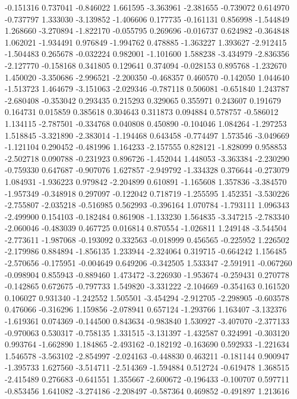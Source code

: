 -0.151316
0.737041
-0.846022
1.661595
-3.363961
-2.381655
-0.739072
0.614970
-0.737797
1.333030
-3.139852
-1.406606
0.177735
-0.161131
0.856998
-1.544849
1.268660
-3.270894
-1.822170
-0.055795
0.269696
-0.016737
0.624982
-0.364848
1.062021
-1.934491
0.976849
-1.994762
0.478885
-1.363227
1.393627
-2.912415
-1.504483
0.265678
-0.032224
0.982001
-1.101600
1.588238
-3.434979
-2.836356
-2.127770
-0.158168
0.341805
0.129641
0.374094
-0.028153
0.895768
-1.232670
1.450020
-3.350686
-2.996521
-2.200350
-0.468357
0.460570
-0.142050
1.044640
-1.513723
1.464679
-3.151063
-2.029346
-0.787118
0.506081
-0.651840
1.243787
-2.680408
-0.353042
0.293435
0.215293
0.329065
0.355971
0.243607
0.191679
0.164731
0.015859
0.385618
0.304643
0.311873
0.094884
0.578757
-0.586012
1.134115
-2.787501
-0.334768
0.040808
0.450890
-0.104046
1.084264
-1.297253
1.518845
-3.321890
-2.383014
-1.194468
0.643458
-0.774497
1.573546
-3.049669
-1.121104
0.290452
-0.481996
1.164233
-2.157555
0.828121
-1.828099
0.958853
-2.502718
0.090788
-0.231923
0.896726
-1.452044
1.448053
-3.363384
-2.230290
-0.759330
0.647687
-0.907076
1.627857
-2.949792
-1.334328
0.376644
-0.273079
1.084931
-1.936223
0.979842
-2.204899
0.610891
-1.165608
1.357836
-3.384570
-1.957349
-0.348918
0.297097
-0.122042
0.718719
-1.255595
1.452351
-3.530226
-2.755807
-2.035218
-0.516985
0.562993
-0.396164
1.070784
-1.793111
1.096343
-2.499900
0.154103
-0.182484
0.861908
-1.133230
1.564835
-3.347215
-2.783340
-2.060046
-0.483039
0.467725
0.016814
0.870554
-1.026811
1.249148
-3.544504
-2.773611
-1.987068
-0.193092
0.332563
-0.018999
0.456565
-0.225952
1.226502
-2.179986
0.884894
-1.856135
1.233944
-2.324064
0.319715
-0.664242
1.156485
-2.570656
-0.175951
-0.004649
0.649206
-0.342505
1.533347
-2.591911
-0.067260
-0.098904
0.855943
-0.889460
1.473472
-3.226930
-1.953674
-0.259431
0.270778
-0.142865
0.672675
-0.797733
1.549820
-3.331222
-2.104669
-0.354163
0.161520
0.106027
0.931340
-1.242552
1.505501
-3.454294
-2.912705
-2.298905
-0.603578
0.476066
-0.316296
1.159856
-2.078941
0.657124
-1.293766
1.163407
-3.132376
-1.619361
0.074369
-0.144500
0.843634
-0.983840
1.530927
-3.407070
-2.377133
-0.970063
0.530317
-0.758135
1.331515
-3.131397
-1.432587
0.324991
-0.303120
0.993764
-1.662890
1.184865
-2.493162
-0.182192
-0.163690
0.592933
-1.221634
1.546578
-3.563102
-2.854997
-2.024163
-0.448830
0.463211
-0.181144
0.900947
-1.395733
1.627560
-3.514711
-2.514369
-1.594884
0.512724
-0.619478
1.368515
-2.415489
0.276683
-0.641551
1.355667
-2.600672
-0.196433
-0.100707
0.597711
-0.853456
1.641082
-3.274186
-2.208497
-0.587364
0.469852
-0.491897
1.213616
